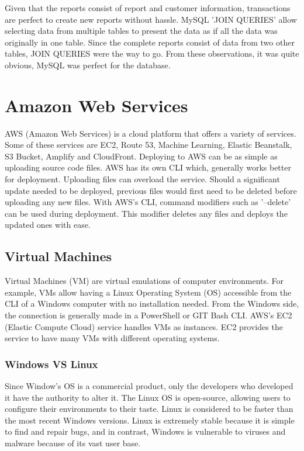 Given that the reports consist of report and customer information, transactions are perfect to create new reports without hassle. MySQL 'JOIN QUERIES' allow selecting data from multiple tables to present the data as if all the data was originally in one table. Since the complete reports consist of data from two other tables, JOIN QUERIES were the way to go. From these observations, it was quite obvious, MySQL was perfect for the database. 

\section{Amazon Web Services}
AWS (Amazon Web Services) is a cloud platform that offers a variety of services. Some of these services are EC2, Route 53, Machine Learning, Elastic Beanstalk, S3 Bucket, Amplify and CloudFront. Deploying to AWS can be as simple as uploading source code files. AWS has its own CLI which, generally works better for deployment. Uploading files can overload the service. Should a significant update needed to be deployed, previous files would first need to be deleted before uploading any new files. With AWS's CLI, command modifiers such as '--delete' can be used during deployment. This modifier deletes any files and deploys the updated ones with ease.

\subsection{Virtual Machines}
Virtual Machines (VM) are virtual emulations of computer environments. \cite{ref20} For example, VMs allow having a Linux Operating System (OS) accessible from the CLI of a Windows computer with no installation needed. From the Windows side, the connection is generally made in a PowerShell or GIT Bash CLI. AWS's EC2 (Elastic Compute Cloud) service handles VMs as instances. EC2 provides the service to have many VMs with different operating systems.

\subsubsection{Windows VS Linux}
Since Window's OS is a commercial product, only the developers who developed it have the authority to alter it. The Linux OS is open-source, allowing users to configure their environments to their taste. Linux is considered to be faster than the most recent Windows versions. Linux is extremely stable because it is simple to find and repair bugs, and in contrast, Windows is vulnerable to viruses and malware because of its vast user base. \cite{ref21}

